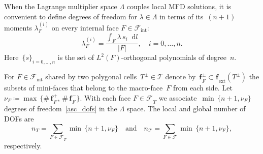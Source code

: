 \documentclass[12pt]{article}
\newcommand{\svginputw}[2][\linewidth]{\def\svgwidth{#1}} %
\newcommand{\vect}[1]{\boldsymbol{\mathbf{#1}}}
\newcommand{\bcell}{T}
\newcommand{\bmesh}{{\vect{\mathcal T}}}
\newcommand{\mmesh}{{\vect{\mathcal \tau}}}
\newcommand{\bfaces}[1][]{{\vect{\mathcal F}_{\text{#1}}}}
\newcommand{\mfaces}[1][]{{\vect{ f}_{\text{#1}}}}
\newcommand*\diff{\mathop{}\!\mathrm{d}}
\begin{document}
%	
	
When the Lagrange multiplier space $\Lambda$ couples local MFD solutions, it is convenient to define
degrees of freedom for $\lambda\in\Lambda$ in terms of its~$(n+1)$ moments $\lambda^{(i)}_F$ on every internal face $F\in\bfaces[int]$:
	\begin{equation}\label{asc_dofs}
		\lambda^{(i)}_F=\frac{\int_F  \lambda\,s_i \diff l}{|F|}, \quad i = 0, \dots, n.
	\end{equation}
	Here~$\{s\}_{i=0,\dots,n}$ is the set of $L^2(F)$-orthogonal polynomials of degree~$n$.
	
 For $F \in \bfaces[int]$ shared by two polygonal cells~$\bcell^\pm\in \bmesh$  denote by~$\mfaces^\pm_F \subset \mfaces_{\text{ext}}(T^\pm)$ the subsets of mini-faces that belong to the macro-face~$F$ from each side.  Let~$\nu_F \coloneqq \max\,\{ \#\,\mfaces^+_F,\,\#\,\mfaces^-_F \}$.  	
With each face $F \in \bfaces_\bcell$ we associate~$\min\,\{ n+1, \nu_F \}$ degrees of freedom~\eqref{asc_dofs} in the $\Lambda$ space. The local and global number of DOFs are
	\[
		n_\bcell = \sum_{F \in \bfaces_\bcell} \min\,\{ n+1, \nu_F \} \quad\text{and}\quad
		n_\bmesh = \sum_{F \in \bfaces} \min\,\{ n+1, \nu_F \},
	\]
 respectively.
	
\end{document}
